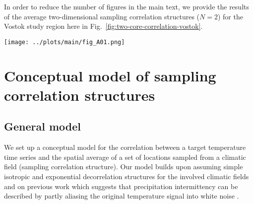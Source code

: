 \documentclass[cp, manuscript]{copernicus}
\begin{document}
In order to reduce the number of figures in the main text, we provide the
results of the average two-dimensional sampling correlation structures ($N=2$)
for the Vostok study region here in Fig.~\ref{fig:two-core-correlation-vostok}.

\begin{figure*}[t]%
\centering
\texttt{[image: ../plots/main/fig\_A01.png]}
\caption{%
  Sampling correlation structures with temperature in the two-dimensional case
  of sampling two locations in the Vostok region. Shown is the mean correlation
  of all possible single correlations from averaging two grid cells of
  (\textbf{a}) $T_{\mathrm{2m}}$, (\textbf{b}) $T_{\mathrm{2m}}^{\mathrm{(pw)}}$
  and (\textbf{c}) $\delta^{18}\mathrm{O}^{\mathrm{(pw)}}$ time series sampled
  from the same or from two different rings, averaged over all target sites in
  the given region. The axes display the distance from the target, where the $x$
  ($y$) axis stands for the first (second) sampled ring and tickmarks
  indicate the radius of the midpoints of the rings. Note that for
  $\delta^{18}\mathrm{O}^{\mathrm{(pw)}}$ the -- albeit marginal -- correlation
  maximum is located for combining the innermost ring with the ring between
  $500$--$750$\,km.}
\label{fig:two-core-correlation-vostok}%
\end{figure*}%

\section{Conceptual model of sampling correlation structures}
\label{app:concept.model}

\subsection{General model}
\label{app:concept.model.general}

We set up a conceptual model for the correlation between a target temperature
time series and the spatial average of a set of locations sampled from a
climatic field (sampling correlation structure). Our model builds upon assuming
simple isotropic and exponential decorrelation structures for the involved
climatic fields and on previous work which suggests that precipitation
intermittency can be described by partly aliasing the original temperature
signal into white noise \citep{Laepple2018}.
\end{document}
